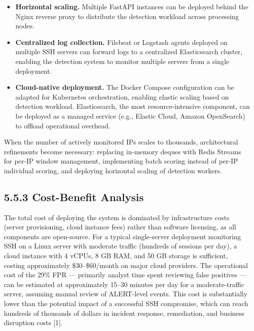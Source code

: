 \documentclass[
  a4paper]{report}
\providecommand{\tightlist}{%
  \setlength{\itemsep}{0pt}\setlength{\parskip}{0pt}}
\begin{document}
\begin{itemize}
\tightlist
\item
  \textbf{Horizontal scaling.} Multiple FastAPI instances can be
  deployed behind the Nginx reverse proxy to distribute the detection
  workload across processing nodes.
\item
  \textbf{Centralized log collection.} Filebeat or Logstash agents
  deployed on multiple SSH servers can forward logs to a centralized
  Elasticsearch cluster, enabling the detection system to monitor
  multiple servers from a single deployment.
\item
  \textbf{Cloud-native deployment.} The Docker Compose configuration can
  be adapted for Kubernetes orchestration, enabling elastic scaling
  based on detection workload. Elasticsearch, the most
  resource-intensive component, can be deployed as a managed service
  (e.g., Elastic Cloud, Amazon OpenSearch) to offload operational
  overhead.
\end{itemize}

When the number of actively monitored IPs scales to thousands,
architectural refinements become necessary: replacing in-memory deques
with Redis Streams for per-IP window management, implementing batch
scoring instead of per-IP individual scoring, and deploying horizontal
scaling of detection workers.

\subsection{5.5.3 Cost-Benefit Analysis}\label{cost-benefit-analysis}

The total cost of deploying the system is dominated by infrastructure
costs (server provisioning, cloud instance fees) rather than software
licensing, as all components are open-source. For a typical
single-server deployment monitoring SSH on a Linux server with moderate
traffic (hundreds of sessions per day), a cloud instance with 4 vCPUs, 8
GB RAM, and 50 GB storage is sufficient, costing approximately
\$30--\$60/month on major cloud providers. The operational cost of the
29\% FPR --- primarily analyst time spent reviewing false positives ---
can be estimated at approximately 15--30 minutes per day for a
moderate-traffic server, assuming manual review of ALERT-level events.
This cost is substantially lower than the potential impact of a
successful SSH compromise, which can reach hundreds of thousands of
dollars in incident response, remediation, and business disruption costs
{[}1{]}.
\end{document}
